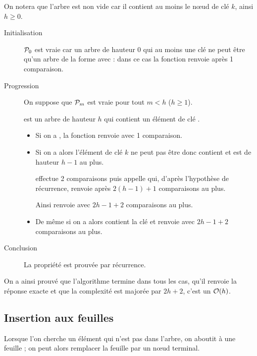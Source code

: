 On notera que l'arbre est non vide car il contient au moins le nœud de clé $k$, ainsi $h\ge 0$.

\begin{description}
\item[Initialisation] ${\cal P}_0$ est vraie car un arbre de hauteur 0 qui au moins une clé ne peut être qu'un arbre de la forme 
  avec  :  dans ce cas la fonction renvoie  après 1 comparaison.

\item[Progression] On suppose que  ${\cal P}_m$ est vraie pour tout $m< h$ ($h\ge 1$). 

 est un arbre de hauteur $h$ qui contient  un élément de clé .

\begin{itemize}
\item Si on a , la fonction  renvoie  avec 1 comparaison.

\item Si on a  alors l'élément de clé $k$ ne peut pas être  donc  contient  et est de hauteur $h-1$ au plus.

  effectue 2 comparaisons puis appelle  qui, d'après l'hypothèse de récurrence, renvoie  après $2(h-1)+1$ comparaisons au plus. 
 
 Ainsi  renvoie  avec $2h-1+2$ comparaisons au plus.
 
\item De même si on a  alors  contient la clé   et  renvoie  avec $2h-1+2$ comparaisons au plus.
\end{itemize}
\item[Conclusion] La propriété est prouvée par récurrence.

\end{description}

 On a ainsi prouvé que l'algorithme termine dans tous les cas, qu'il renvoie la réponse exacte et que la complexité est majorée par $2h+2$, c'est un ${\cal O}(h)$.
\subsection{Insertion aux feuilles}
Lorsque l'on cherche un élément qui n'est pas dans l'arbre, on aboutit à une feuille ; on peut alors remplacer la feuille par un nœud terminal.

